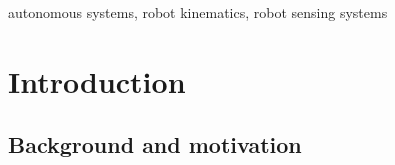 \documentclass[twoside,conference,a4paper]{IEEEtran}
\begin{document}
\begin{IEEEkeywords}
    autonomous systems, robot kinematics, robot sensing systems
\end{IEEEkeywords}


\section{Introduction}
\subsection{Background and motivation}
\end{document}
